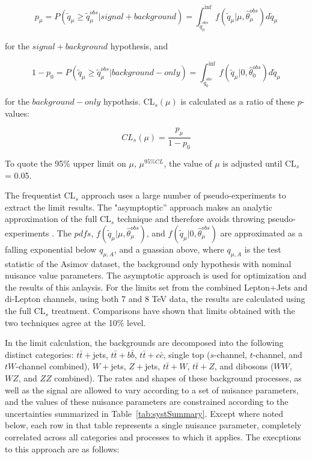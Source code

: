 \begin{equation}
p_{\mu} = P( \tilde{q}_{\mu} \ge \tilde{q}_{\mu}^{obs} | signal +
background ) = \int_{\tilde{q}_{\mu}^{obs}}^{\inf} f(\tilde{q}_{\mu}|\mu,
\hat{\theta}_{\mu}^{obs}) d\tilde{q}_{\mu} 
\end{equation}

\noindent for the $signal+background$ hypothesis, and 

\begin{equation}
1 - p_{0} = P( \tilde{q}_{\mu} \ge \tilde{q}_{\mu}^{obs} |
background-only ) = \int_{\tilde{q}_{0}^{obs}}^{\inf}
f(\tilde{q}_{\mu}|0,\hat{\theta}_{0}^{obs}) d\tilde{q}_{\mu} 
\end{equation}

\noindent for the $background-only$ hypothsis.  CL$_{s}(\mu)$ is
calculated as a ratio of these $p$-values:

\begin{equation}
CL_{s}(\mu) = \frac{p_{\mu}}{1-p_{0}}
\end{equation}

\noindent To quote the 95\% upper limit on $\mu$, $\mu^{95\%CL}$, the
value of $\mu$ is adjusted until CL$_{s}$ = 0.05. 

\par The frequentist CL$_s$ approach uses a large number of
pseudo-experiments to extract the limit results.  The "asymptoptic''
approach makes an analytic approximation of the full CL$_s$ technique
and therefore avoids throwing pseudo-experiments \cite{Cowan:2010js}.
The $pdfs$, $f(\tilde{q}_{\mu}|\mu,
\hat{\theta}_{\mu}^{obs})$, and $f(\tilde{q}_{\mu}|0,
\hat{\theta}_{\mu}^{obs})$ are approximated as a falling exponential
below $q_{\mu,A}$, and a guassian above, where $q_{\mu,A}$ is the test
statistic of the Asimov dataset, the background only hypothesis with
nominal nuisance value parameters.  The asymptotic approach is used
for optimization and the results of this anlaysis.  For the limits set
from the combined Lepton+Jets and di-Lepton channels, using both 7 and
8 TeV data, the results are calculated using the full CL$_s$
treatment. Comparisons have shown that limits obtained with the two
techniques agree at the 10\% level.  

\par In the limit calculation, the backgrounds are decomposed into the
following distinct categories: $t\bar{t}+$jets, $t\bar{t}+b\bar{b}$,
$t\bar{t}+c\bar{c}$, single top ($s$-channel, $t$-channel, and
$tW$-channel combined), $W+$jets, $Z+$jets, $t\bar{t}+W$,
$t\bar{t}+Z$, and dibosons ($WW$, $WZ$, and $ZZ$ combined).  The rates
and shapes of these background processes, as well as the signal are
allowed to vary according to a set of nuisance parameters, and the
values of these nuisance parameters are constrained according to the
uncertainties summarized in Table~\ref{tab:systSummary}.  Except where
noted below, each row in that table represents a single nuisance
parameter, completely correlated across all categories and processes
to which it applies.  The execptions to this approach are as follows: 

